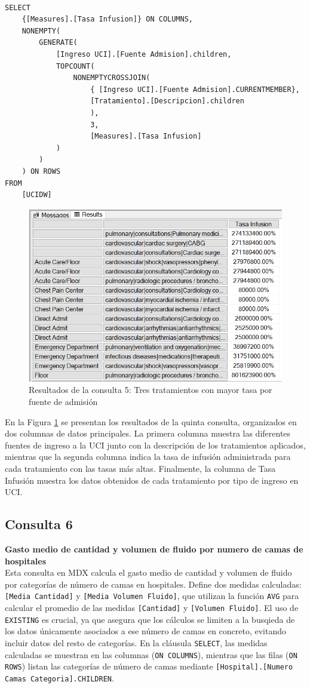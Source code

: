 \documentclass{article}
\begin{document}
\begin{lstlisting}[style=ddlstyle, label=lst:consulta5,caption=Consulta 5: Tres tratamientos con mayor tasa por fuente de admisión]
	
SELECT 
	{[Measures].[Tasa Infusion]} ON COLUMNS, 
	NONEMPTY(
		GENERATE(
			[Ingreso UCI].[Fuente Admision].children, 
			TOPCOUNT(
				NONEMPTYCROSSJOIN(
					{ [Ingreso UCI].[Fuente Admision].CURRENTMEMBER}, 
					[Tratamiento].[Descripcion].children
					), 
					3, 
					[Measures].[Tasa Infusion]
			)
		)
	) ON ROWS
FROM 
	[UCIDW]
\end{lstlisting}

\begin{figure}[H]
	\centering
	\includegraphics[width=0.6\linewidth]{images/consulta5.png}
	\caption{Resultados de la consulta 5: Tres tratamientos con mayor tasa por fuente de admisión}
	\label{fig:consulta5}
\end{figure}

En la Figura \ref{fig:consulta5} se presentan los resultados de la quinta consulta, organizados en dos columnas de datos principales. La primera columna muestra las diferentes fuentes de ingreso a la UCI junto con la descripción de los tratamientos aplicados, mientras que la segunda columna indica la tasa de infusión administrada para cada tratamiento con las tasas más altas. Finalmente, la columna de Tasa Infusión muestra los datos obtenidos de cada tratamiento por tipo de ingreso en UCI.


\subsection{Consulta 6}

\textbf{Gasto medio de cantidad y volumen de fluido por numero de camas de hospitales}
\\

Esta consulta en MDX calcula el gasto medio de cantidad y volumen de fluido por categorías de número de camas en hospitales. Define dos medidas calculadas: \texttt{[Media Cantidad]} y \texttt{[Media Volumen Fluido]}, que utilizan la función \texttt{AVG} para calcular el promedio de las medidas \texttt{[Cantidad]} y \texttt{[Volumen Fluido]}. El uso de \texttt{EXISTING} es crucial, ya que asegura que los cálculos se limiten a la busqieda de los datos únicamente asociados a ese número de camas en concreto, evitando incluir datos del resto de categorías. En la cláusula \texttt{SELECT}, las medidas calculadas se muestran en las columnas (\texttt{ON COLUMNS}), mientras que las filas (\texttt{ON ROWS}) listan las categorías de número de camas mediante \texttt{[Hospital].[Numero Camas Categoria].CHILDREN}.
\\
\end{document}
